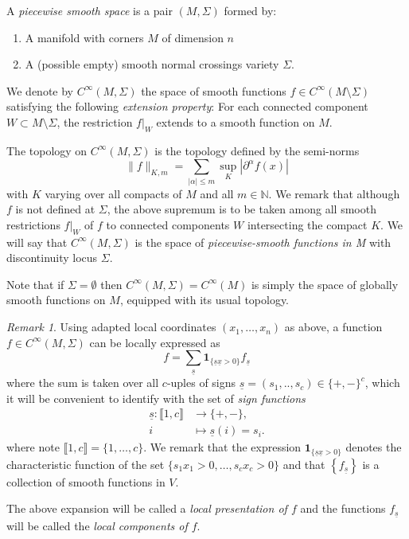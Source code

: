 \documentclass[11pt,psamsfonts]{article}
\newcommand{\nobracket}{}
\newcommand{\tmem}[1]{{\em #1\/}}
\newcommand{\tmmathbf}[1]{\ensuremath{\boldsymbol{#1}}}
\newenvironment{enumeratenumeric}{\begin{enumerate}[1.] }{\end{enumerate}}
\theoremstyle{definition}
\theoremstyle{remark}
\newtheorem{Remark}[Theorem]{Remark}
\begin{document}
A {\tmem{piecewise smooth space}} is a pair $(M, \Sigma)$ formed by:
\begin{enumeratenumeric}
\item A manifold
with corners $M$ of dimension $n$
\item A (possible empty) smooth normal
crossings variety $\Sigma$.
\end{enumeratenumeric}
We denote by $C^{\infty} (M, \Sigma)$ the space of smooth functions $f \in
C^{\infty} (M \setminus \Sigma)$ satisfying the following {\em extension property}:
For each connected component $W \subset M \setminus \Sigma$, the restriction
$f |_W \nobracket$ extends to a smooth function on $M$. 

The topology on $C^{\infty} (M, \Sigma)$ is the topology defined by the semi-norms
\[ \| f \|_{K, m} = \sum_{| \alpha | \le  m} \sup_K \left|
   {\partial^{\alpha}}  f (x) \right| \]
with $K$ varying over all compacts of $M$ and all $m \in \mathbb{N}$. We
remark that although $f$ is not defined at $\Sigma$, the above supremum is to
be taken among all smooth restrictions $f |_W \nobracket$ of $f$ to connected
components $W$ intersecting the compact $K.$ We will say that $C^{\infty} (M,\Sigma)$ is the space of \tmem{piecewise-smooth functions in M} with
discontinuity locus $\Sigma$.

Note that if $\Sigma = \emptyset$ then $C^{\infty}(M,\Sigma) = C^{\infty}(M)$ is simply the space of globally smooth functions on $M$, equipped with its usual topology. 
\begin{Remark}
Using adapted local coordinates $(x_1, \ldots, x_n)$ as above, a function $f
\in C^{\infty}(M, \Sigma)$ can be locally expressed as
\begin{equation} \label{loc-presentation}
  f = \sum_{\underline{s}} \tmmathbf{1}_{\{ \underline{s} \underline{x}  > 0 \}} f_{\underline{s}}
\end{equation}
where the sum is taken over all $c$-uples of signs $\underline{s} = (s_1,..,s_c)\in \{+,-\}^c$, which it will be convenient to identify with the set of {\em sign functions} 
\[
\begin{aligned}
\underline{s} : \llbracket 1, c \rrbracket &\longrightarrow \{+, -\}, \\
i &\longmapsto \underline{s}(i) = s_i .
\end{aligned}
\]
where note $\llbracket 1, c \rrbracket=\{1,\ldots,c\}$. We remark that the expression $\tmmathbf{1}_{\{ \underline{s} \underline{x}  > 0 \}}$ denotes the characteristic function of the set
$\{ s_1 x_1 >  0, \ldots, s_c x_c >  0 \}$ and that $\left\{ {f_{\underline{s}}}
\right\} $ is a collection of smooth functions in $V$. 
\end{Remark}
The above expansion
will be called a {\tmem{local presentation of $f$}} and the functions $f_{\underline{s}}$
will be called the {\tmem{local components of $f$}}.
\end{document}
